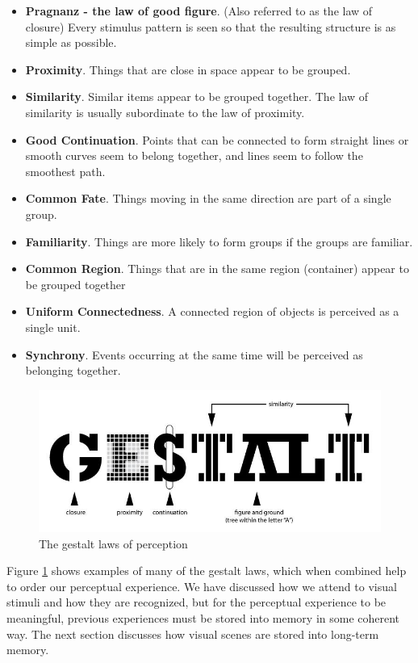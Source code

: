 \documentclass[11pt]{isuthesis}\usepackage[]{graphicx}\usepackage[]{color}
\begin{document}
\begin{itemize}
\item \textbf{Pragnanz - the law of good figure}. (Also referred to as the law of closure) Every stimulus pattern is seen so that the resulting structure is as simple as possible. 
\item \textbf{Proximity}. Things that are close in space appear to be grouped. 
\item \textbf{Similarity}. Similar items appear to be grouped together. The law of similarity is usually subordinate to the law of proximity. 
\item \textbf{Good Continuation}. Points that can be connected to form straight lines or smooth curves seem to belong together, and lines seem to follow the smoothest path. 
\item \textbf{Common Fate}. Things moving in the same direction are part of a single group.
\item \textbf{Familiarity}. Things are more likely to form groups if the groups are familiar. 
\item \textbf{Common Region}. Things that are in the same region (container) appear to be grouped together
\item \textbf{Uniform Connectedness}. A connected region of objects is perceived as a single unit.
\item \textbf{Synchrony}. Events occurring at the same time will be perceived as belonging together.
\end{itemize}

\begin{figure}[htbp]\centering
\includegraphics[width=.9\textwidth]{gestalt}
\caption[The gestalt laws of perception]{The gestalt laws of perception \protect\footnotemark}\label{fig:gestaltlaws}
\end{figure}
\protect{}
Figure \ref{fig:gestaltlaws} shows examples of many of the gestalt laws, which when combined help to order our perceptual experience. We have discussed how we attend to visual stimuli and how they are recognized, but for the perceptual experience to be meaningful, previous experiences must be stored into memory in some coherent way. The next section discusses how visual scenes are stored into long-term memory. 
\end{document}

